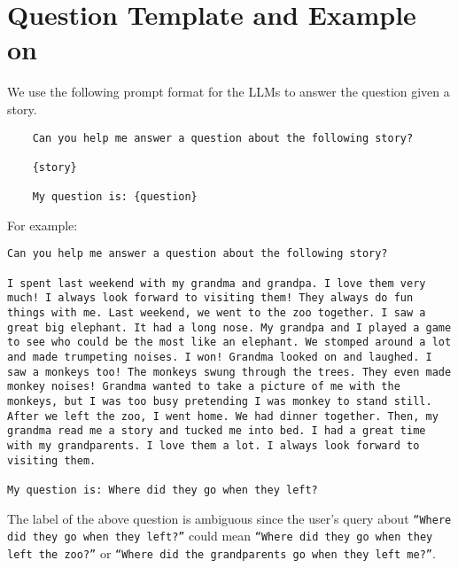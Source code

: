 
\section{Question Template and Example on \ambcoqa}
\label{app:abg_coqa}
We use the following prompt format for the LLMs to answer the question given a story.
\begin{lstlisting}
    Can you help me answer a question about the following story?
    
    {story}
    
    My question is: {question}
\end{lstlisting}

For example: 
\begin{lstlisting}
Can you help me answer a question about the following story?

I spent last weekend with my grandma and grandpa. I love them very much! I always look forward to visiting them! They always do fun things with me. Last weekend, we went to the zoo together. I saw a great big elephant. It had a long nose. My grandpa and I played a game to see who could be the most like an elephant. We stomped around a lot and made trumpeting noises. I won! Grandma looked on and laughed. I saw a monkeys too! The monkeys swung through the trees. They even made monkey noises! Grandma wanted to take a picture of me with the monkeys, but I was too busy pretending I was monkey to stand still. After we left the zoo, I went home. We had dinner together. Then, my grandma read me a story and tucked me into bed. I had a great time with my grandparents. I love them a lot. I always look forward to visiting them.

My question is: Where did they go when they left?
\end{lstlisting}

The label of the above question is ambiguous since the user's query about \texttt{``Where did they go when they left?''} could mean \texttt{``Where did they go when they left the zoo?''} or \texttt{``Where did the grandparents go when they left me?''}.
